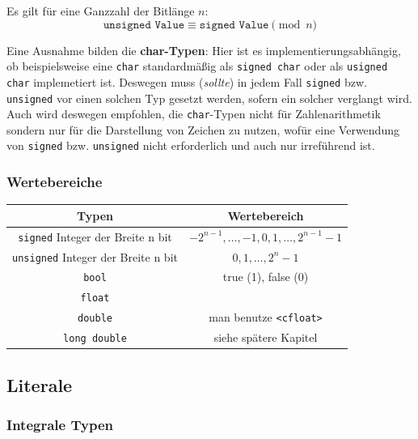 \documentclass[a4paper]{report}
\begin{document}
Es gilt für eine Ganzzahl der Bitlänge $n$:
\[
	\texttt{unsigned Value} \equiv \texttt{signed Value} \pmod{n}
\]
 
Eine Ausnahme bilden die \textbf{char-Typen}: Hier ist es implementierungsabhängig, ob beispielsweise eine \texttt{char} standardmäßig als \texttt{signed char} oder als \texttt{usigned char} implemetiert ist. Deswegen muss (\textit{sollte}) in jedem Fall \texttt{signed} bzw. \texttt{unsigned} vor einen solchen Typ gesetzt werden, sofern ein solcher verglangt wird. Auch wird deswegen empfohlen, die \texttt{char}-Typen nicht für Zahlenarithmetik sondern nur für die Darstellung von Zeichen zu nutzen, wofür eine Verwendung von \texttt{signed} bzw. \texttt{unsigned} nicht erforderlich und auch nur irreführend ist.

\subsubsection{Wertebereiche}

\begin{center}
\begin{tabular}{|c|c|}
	\hline
	\textbf{Typen}	& \textbf{Wertebereich} \\ \hline
	\texttt{signed} Integer der Breite n bit & $-2^{n-1}, \dots , -1,0,1, \dots ,2^{n-1}-1$ \\ 
	\texttt{unsigned} Integer der Breite n bit & $0,1, \dots ,2^{n}-1$ \\\hline
	\texttt{bool} & true (1), false (0) \\ \hline
	\texttt{float} & \\
	\texttt{double} & man benutze \texttt{<cfloat>}\\%
	\texttt{long double} & siehe spätere Kapitel\\ \hline
	
\end{tabular}
\end{center}

\subsection{Literale}

\subsubsection{Integrale Typen}
\end{document}
